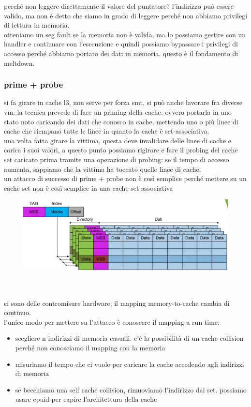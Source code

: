 \documentclass[12pt, oneside]{extbook} %
\begin{document}
perché non leggere direttamente il valore del puntatore? l'indirizzo può essere valido, ma non è detto che siamo in grado di leggere perché non abbiamo privilegi di lettura in memoria.\\ otteniamo un seg fault se la memoria non è valida, ma lo possiamo gestire con un handler e continuare con l'esecuzione e quindi possiamo bypassare i privilegi di accesso perché abbiamo portato dei dati in memoria. questo è il fondamento di meltdown.
\subsubsection{prime + probe}
si fa girare in cache l3, non serve per forza smt, si può anche lavorare fra diverse vm. la tecnica prevede di fare un priming della cache, ovvero portarla in uno stato noto caricando dei dati che conosco in cache, mettendo uno o più linee di cache che riempano tutte le linee in quanto la cache è set-associativa.\\ una volta fatta girare la vittima, questa deve invalidare delle linee di cache e carica i suoi valori, a questo punto possiamo rigirare e fare il probing del cache set caricato prima tramite una operazione di probing: se il tempo di accesso aumenta, sappiamo che la vittima ha toccato quelle linee di cache.\\ un attacco di successo di prime + probe non è così semplice perché mettere su un cache set non è così semplice in una cache set-associativa\\
\begin{figure}[!h]
	\includegraphics[scale=0.2]{immagini/prime_probe.png}
\end{figure}\\\\
ci sono delle contromisure hardware, il mapping memory-to-cache cambia di continuo.\\l'unico modo per mettere su l'attacco è conoscere il mapping a run time:
\begin{itemize}
\item scegliere n indirizzi di memoria casuali. c'è la possibilità di un cache collision perché non conosciamo il mapping con la memoria
\item misuriamo il tempo che ci vuole per caricare la cache accedendo agli indirizzi di memoria
\item se becchiamo una self cache collision, rimuoviamo l'indirizzo dal set. possiamo usare cpuid per capire l'architettura della cache
\end{itemize}
\end{document}
